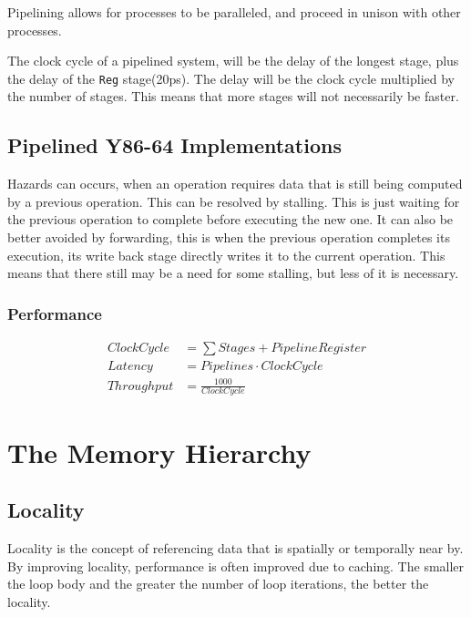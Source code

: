 \documentclass[10pt]{armath}
\newcommand{\s}[1]{\texttt{#1}}
\begin{document}
Pipelining allows for processes to be paralleled, and proceed in unison with
other processes.

The clock cycle of a pipelined system, will be the delay of the longest stage,
plus the delay of the \s{Reg} stage(20ps). The delay will be the clock cycle
multiplied by the number of stages. This means that more stages will not
necessarily be faster.

\subsection{Pipelined Y86-64 Implementations}%
\label{sub:pipelined_y86_64_implementations}

Hazards can occurs, when an operation requires data that is still being
computed by a previous operation. This can be resolved by stalling. This is
just waiting for the previous operation to complete before executing the new
one. It can also be better avoided by forwarding, this is when the previous
operation completes its execution, its write back stage directly writes it to
the current operation. This means that there still may be a need for some
stalling, but less of it is necessary.

\subsubsection{Performance}%
\label{ssub:preformance}

\begin{align*}
  Clock Cycle &= \sum Stages + Pipeline Register\\
  Latency &= Pipelines \cdot Clock Cycle\\
  Throughput &= \frac{1000}{Clock Cycle}
\end{align*}

\section{The Memory Hierarchy}%
\label{sec:the_memory_hierarchy}

\subsection{Locality}%
\label{sub:locality}

Locality is the concept of referencing data that is spatially or temporally near
by. By improving locality, performance is often improved due to caching. The
smaller the loop body and the greater the number of loop iterations, the better
the locality.
\end{document}
